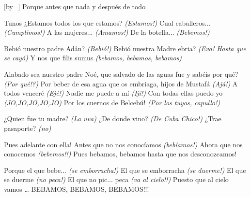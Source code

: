 
[by={}]
    \beginverse
        Porque antes que nada y después de todo
    \endverse

    \beginverse
        Tunos ¿Estamos todos los que estamos? \textit{(Estamos!)}
        Cual caballeros... \textit{(Cumplimos!)}
        A las mujeres... \textit{(Amamos!)}
        De la botella... \textit{(Bebemos!)}
    \endverse

    \beginverse
        Bebió nuestro padre Adán? \textit{(Bebió!)}
        Bebió nuestra Madre ebria? \textit{(Eva! Hasta que se cayó)}
        Y nos que filis sumus \textit{(bebamos, bebamos, bebamos)}
    \endverse

    \beginverse
        Alabado sea nuestro padre Noé, que salvado
        de las aguas fue y sabéis por qué? \textit{(Por qué!?)}
        Por beber de esa agua que os embriaga,
        hijos de Mustafá \textit{(Ajá!)}
        A todos venceré \textit{(Ejé!)}
        Nadie me puede a mí \textit{(Ijí!)}
        Con todas ellas puedo yo \textit{(JO,JO,JO,JO,JO)}
        Por los cuernos de Belcebú! \textit{(Por los tuyos, capullo!)}
    \endverse

    \beginverse
        ¿Quien fue tu madre? \textit{(La uva)}
        ¿De donde vino? \textit{(De Cuba Chico!)}
        ¿Trae pasaporte? \textit{(no)}
    \endverse

    \beginverse
        Pues adelante con ella!
        Antes que no nos conocíamos \textit{(bebíamos!)}
        Ahora que nos conocemos \textit{(bebemos!!)}
        Pues bebamos,
        bebamos hasta que nos desconozcamos!
    \endverse

    \beginverse
        Porque el que bebe... \textit{(se emborracha!)}
        El que se emborracha \textit{(se duerme!)}
        El que se duerme \textit{(no peca!)}
        El que no pic... peca \textit{(va al cielo!!)}
        Puesto que al cielo vamos … BEBAMOS, BEBAMOS, BEBAMOS!!!
    \endverse

\endsong

\scleardpage
